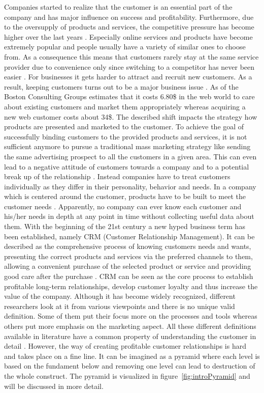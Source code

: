 Companies started to realize that the customer is an essential part of the company and has major influence on success and profitability. Furthermore, due to the oversupply of products and services, the competitive pressure has become higher over the last years . Especially online services and products have become extremely popular and people usually have a variety of similar ones to choose from. As a consequence this means that customers rarely stay at the same service provider due to convenience only since switching to a competitor has never been easier \cite{rygielski2002data}. For businesses it gets harder to attract and recruit new customers. As a result, keeping customers turns out to be a major business issue \cite{nerdinger2015}. As of \cite{chen2003understanding} the Boston Consulting Groups estimates that it costs 6.80\$ in the web world to care about existing customers and market them appropriately whereas acquiring a new web customer costs about 34\$. The described shift impacts the strategy how products are presented and marketed to the customer. To achieve the goal of successfully binding customers to the provided products and services, it is not sufficient anymore to pursue a traditional mass marketing strategy like sending the same advertising prospect to all the customers in a given area. This can even lead to a negative attitude of customers towards a company and to a potential break up of the relationship \cite{rygielski2002data, neckel2015}. Instead companies have to treat customers individually as they differ in their personality, behavior and needs. In a company which is centered around the customer, products have to be built to meet the customer needs \cite{chen2003understanding}. Apparently, no company can ever know each customer and his/her needs in depth at any point in time without collecting useful data about them. With the beginning of the 21st century a new hyped business term has been established, namely CRM (Customer Relationship Management). It can be described as the comprehensive process of knowing customers needs and wants, presenting the correct products and services via the preferred channels to them, allowing a convenient purchase of the selected product or service and providing good care after the purchase \cite{rygielski2002data}. CRM can be seen as the core process to establish profitable long-term relationships, develop customer loyalty and thus increase the value of the company. Although it has become widely recognized, different researchers look at it from various viewpoints and there is no unique valid definition. Some of them put their focus more on the processes and tools whereas others put more emphasis on the marketing aspect. All these different definitions available in literature have a common property of understanding the customer in detail \cite{Ngai2009}. However, the way of creating profitable customer relationships is hard and takes place on a fine line. It can be imagined as a pyramid where each level is based on the fundament below and removing one level can lead to destruction of the whole construct. The pyramid is visualized in figure~\ref{fig:introPyramid} and will be discussed in more detail. 

